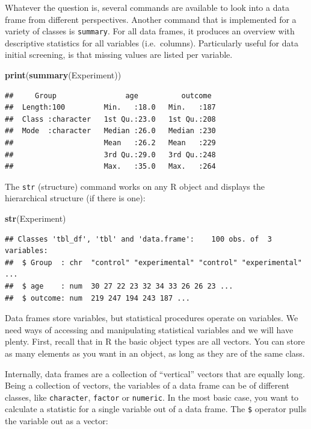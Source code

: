 \documentclass[]{svmono}
\newenvironment{Shaded}{\begin{snugshade}}{\end{snugshade}}
\newcommand{\KeywordTok}[1]{\textcolor[rgb]{0.13,0.29,0.53}{\textbf{#1}}}
\newcommand{\NormalTok}[1]{#1}
\begin{document}
Whatever the question is, several commands are available to look into a
data frame from different perspectives. Another command that is
implemented for a variety of classes is \texttt{summary}. For all data
frames, it produces an overview with descriptive statistics for all
variables (i.e.~columns). Particularly useful for data initial
screening, is that missing values are listed per variable.

\begin{Shaded}
\begin{Highlighting}[]
\KeywordTok{print}\NormalTok{(}\KeywordTok{summary}\NormalTok{(Experiment))}
\end{Highlighting}
\end{Shaded}

\begin{verbatim}
##     Group                age          outcome   
##  Length:100         Min.   :18.0   Min.   :187  
##  Class :character   1st Qu.:23.0   1st Qu.:208  
##  Mode  :character   Median :26.0   Median :230  
##                     Mean   :26.2   Mean   :229  
##                     3rd Qu.:29.0   3rd Qu.:248  
##                     Max.   :35.0   Max.   :264
\end{verbatim}

The \texttt{str} (structure) command works on any R object and displays
the hierarchical structure (if there is one):

\begin{Shaded}
\begin{Highlighting}[]
\KeywordTok{str}\NormalTok{(Experiment)}
\end{Highlighting}
\end{Shaded}

\begin{verbatim}
## Classes 'tbl_df', 'tbl' and 'data.frame':    100 obs. of  3 variables:
##  $ Group  : chr  "control" "experimental" "control" "experimental" ...
##  $ age    : num  30 27 22 23 32 34 33 26 26 23 ...
##  $ outcome: num  219 247 194 243 187 ...
\end{verbatim}

Data frames store variables, but statistical procedures operate on
variables. We need ways of accessing and manipulating statistical
variables and we will have plenty. First, recall that in R the basic
object types are all vectors. You can store as many elements as you want
in an object, as long as they are of the same class.

Internally, data frames are a collection of ``vertical'' vectors that
are equally long. Being a collection of vectors, the variables of a data
frame can be of different classes, like \texttt{character},
\texttt{factor} or \texttt{numeric}. In the most basic case, you want to
calculate a statistic for a single variable out of a data frame. The
\texttt{\$} operator pulls the variable out as a vector:
\end{document}

